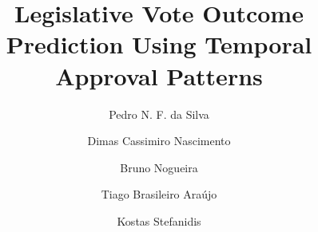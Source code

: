 \documentclass[review]{elsarticle}
\begin{document}
\title{Legislative Vote Outcome Prediction Using Temporal Approval Patterns}

\author[label1,cor1]{Pedro N. F. da Silva}

\author[label1,label2]{Dimas Cassimiro Nascimento}

\author[label1,label3]{Bruno Nogueira}

\author[label4,label5]{Tiago Brasileiro Araújo}

\author[label4]{Kostas Stefanidis}


\address[label1]{Programa de Pós-Graduação da Universidade de Pernambuco, Garanhuns, Pernambuco, Brazil}
\address[label2]{Universidade Federal do Agreste de Pernambuco, Garanhuns, Pernambuco, Brazil}
\address[label3]{Universidade Federal de Alagoas, Maceió, Alagoas, Brazil}

\address[label4]{Faculty of Information Technology and Communication Sciences, Tampere University, 33100 Tampere, Finland}
\address[label5]{Federal Institute of Paraíba, Soledade 58051-900, Brazil}
\end{document}

